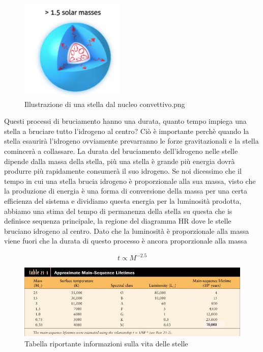 \documentclass[a4paper,11pt]{article}
\begin{document}
    \begin{figure}[h!!]
        \centering
        \includegraphics[width=5cm]{Illustrazione di una stella dal nucleo convettivo.png}
        \caption{Illustrazione di una stella dal nucleo convettivo.png}
        \label{fig:Illustrazione di una stella dal nucleo convettivo.png}
    \end{figure}

    Questi processi di bruciamento hanno una durata, quanto tempo impiega una stella a bruciare tutto l'idrogeno al centro? Ciò è importante perchè quando la stella esaurirà l'idrogeno ovviamente prevarranno le forze gravitazionali e la stella comincerà a collassare. La durata del bruciamento dell'idrogeno nelle stelle dipende dalla massa della stella, più una stella è grande più energia dovrà produrre più rapidamente consumerà il suo idrogeno. Se noi dicessimo che il tempo in cui una stella brucia idrogeno è proporzionale alla sua massa, visto che la produzione di energia è una forma di conversione della massa per una certa efficienza del sistema e dividiamo questa energia per la luminosità prodotta, abbiamo una stima del tempo di permanenza della stella su questa che is definisce sequenza principale, la regione del diagramma HR dove le stelle bruciano idrogeno al centro. Dato che la luminosità è proporzionale alla massa viene fuori che la durata di questo processo è ancora proporzionale alla massa

$$
    t \propto M ^{-2.5}
$$

    \begin{figure}[h!!]
        \centering
        \includegraphics[width=16cm]{Durata di vita delle stelle.png}
        \caption{Tabella riportante informazioni sulla vita delle stelle}
        \label{fig:Durata di vita delle stelle.png}
    \end{figure}
    
\end{document}
